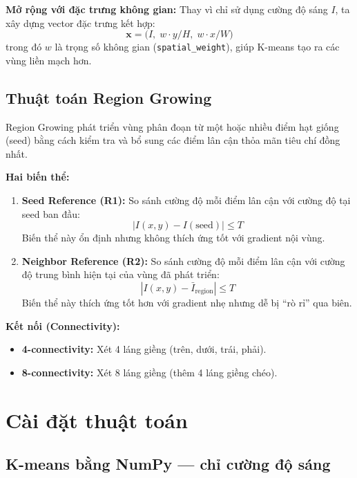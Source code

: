 \documentclass[12pt,a4paper]{article}
\begin{document}
\textbf{Mở rộng với đặc trưng không gian:} Thay vì chỉ sử dụng cường độ sáng $I$, ta xây dựng vector đặc trưng kết hợp:
\[
    \mathbf{x} = \bigl(I,\; w \cdot y/H,\; w \cdot x/W\bigr)
\]
trong đó $w$ là trọng số không gian (\texttt{spatial\_weight}), giúp K-means tạo ra các vùng liền mạch hơn.

\subsection{Thuật toán Region Growing}

Region Growing phát triển vùng phân đoạn từ một hoặc nhiều điểm hạt giống (seed) bằng cách kiểm tra và bổ sung các điểm lân cận thỏa mãn tiêu chí đồng nhất.

\textbf{Hai biến thể:}

\begin{enumerate}
    \item \textbf{Seed Reference (R1):} So sánh cường độ mỗi điểm lân cận với cường độ tại seed ban đầu:
    \[
        |I(x, y) - I(\text{seed})| \leq T
    \]
    Biến thể này ổn định nhưng không thích ứng tốt với gradient nội vùng.

    \item \textbf{Neighbor Reference (R2):} So sánh cường độ mỗi điểm lân cận với cường độ trung bình hiện tại của vùng đã phát triển:
    \[
        |I(x, y) - \bar{I}_{\text{region}}| \leq T
    \]
    Biến thể này thích ứng tốt hơn với gradient nhẹ nhưng dễ bị ``rò rỉ'' qua biên.
\end{enumerate}

\textbf{Kết nối (Connectivity):}
\begin{itemize}
    \item \textbf{4-connectivity:} Xét 4 láng giềng (trên, dưới, trái, phải).
    \item \textbf{8-connectivity:} Xét 8 láng giềng (thêm 4 láng giềng chéo).
\end{itemize}

\section{Cài đặt thuật toán}

\subsection{K-means bằng NumPy --- chỉ cường độ sáng}
\end{document}

